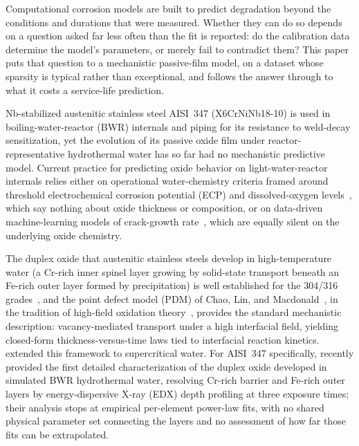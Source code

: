 \documentclass[a4paper,fleqn]{cas-sc}
\begin{document}
Computational corrosion models are built to predict degradation beyond
the conditions and durations that were measured. Whether they can do so
depends on a question asked far less often than the fit is reported: do
the calibration data determine the model's parameters, or merely fail to
contradict them? This paper puts that question to a mechanistic
passive-film model, on a dataset whose sparsity is typical rather than
exceptional, and follows the answer through to what it costs a
service-life prediction.

Nb-stabilized austenitic stainless steel AISI~347 (X6CrNiNb18-10) is
used in boiling-water-reactor (BWR) internals and piping for its
resistance to weld-decay sensitization, yet the evolution of its passive
oxide film under reactor-representative hydrothermal water has so far
had no mechanistic predictive model. Current practice for predicting
oxide behavior on light-water-reactor internals relies either on
operational water-chemistry criteria framed around threshold
electrochemical corrosion potential (ECP) and dissolved-oxygen
levels~\citep{macdonald1992hwc,lin1996ecp,yeh1995damage1,yeh1996damage2},
which say nothing about oxide thickness or composition, or on
data-driven machine-learning models of crack-growth
rate~\citep{igscc_ml_uq2025}, which are equally silent on the underlying
oxide chemistry.

The duplex oxide that austenitic stainless steels develop in
high-temperature water (a Cr-rich inner spinel layer growing by
solid-state transport beneath an Fe-rich outer layer formed by
precipitation) is well established for the 304/316
grades~\citep{robertson1991mechanism,stellwag1998mechanism,ziemniak2002corrosion,kuang2010oxidation,terachi2008corrosion,kim1999oxide,lister1987release},
and the point defect model (PDM) of Chao, Lin, and
Macdonald~\citeyearpar{chao1981pdm1,lin1981pdm2,macdonald1992pdm,macdonald2011history},
in the tradition of high-field oxidation
theory~\citep{cabrera1949oxidation}, provides the standard mechanistic
description: vacancy-mediated transport under a high interfacial field,
yielding closed-form thickness-versus-time laws tied to interfacial
reaction kinetics. \citet{li2020scwpdm} extended this
framework to supercritical water. For AISI~347 specifically, \citet{veile2024} recently provided the first detailed
characterization of the duplex oxide developed in simulated BWR
hydrothermal water, resolving Cr-rich barrier and Fe-rich outer layers
by energy-dispersive X-ray (EDX) depth profiling at three exposure
times; their analysis stops at empirical per-element power-law fits,
with no shared physical parameter set connecting the layers and no
assessment of how far those fits can be extrapolated.
\end{document}
